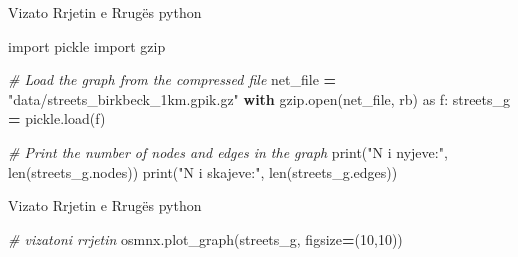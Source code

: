 \documentclass[
  ignorenonframetext,
]{beamer}
\newenvironment{Shaded}{\begin{snugshade}}{\end{snugshade}}
\newcommand{\BuiltInTok}[1]{#1}
\newcommand{\CommentTok}[1]{\textcolor[rgb]{0.56,0.35,0.01}{\textit{#1}}}
\newcommand{\ControlFlowTok}[1]{\textcolor[rgb]{0.13,0.29,0.53}{\textbf{#1}}}
\newcommand{\DecValTok}[1]{\textcolor[rgb]{0.00,0.00,0.81}{#1}}
\newcommand{\ImportTok}[1]{#1}
\newcommand{\NormalTok}[1]{#1}
\newcommand{\OperatorTok}[1]{\textcolor[rgb]{0.81,0.36,0.00}{\textbf{#1}}}
\newcommand{\StringTok}[1]{\textcolor[rgb]{0.31,0.60,0.02}{#1}}
\begin{document}
\begin{frame}[fragile]{Vizato Rrjetin e Rrugës}
\protect\hypertarget{vizato-rrjetin-e-rruguxebs-1}{}
python

\begin{Shaded}
\begin{Highlighting}[]
\ImportTok{import}\NormalTok{ pickle}
\ImportTok{import}\NormalTok{ gzip}

\CommentTok{\# Load the graph from the compressed file}
\NormalTok{net\_file }\OperatorTok{=} \StringTok{"data/streets\_birkbeck\_1km.gpik.gz"}
\ControlFlowTok{with}\NormalTok{ gzip.}\BuiltInTok{open}\NormalTok{(net\_file, }\StringTok{\textquotesingle{}rb\textquotesingle{}}\NormalTok{) }\ImportTok{as}\NormalTok{ f:}
\NormalTok{    streets\_g }\OperatorTok{=}\NormalTok{ pickle.load(f)}

\CommentTok{\# Print the number of nodes and edges in the graph}
\BuiltInTok{print}\NormalTok{(}\StringTok{"N i nyjeve:"}\NormalTok{, }\BuiltInTok{len}\NormalTok{(streets\_g.nodes))}
\BuiltInTok{print}\NormalTok{(}\StringTok{"N i skajeve:"}\NormalTok{, }\BuiltInTok{len}\NormalTok{(streets\_g.edges))}
\end{Highlighting}
\end{Shaded}
\end{frame}

\begin{frame}[fragile]{Vizato Rrjetin e Rrugës}
\protect\hypertarget{vizato-rrjetin-e-rruguxebs-2}{}
python

\begin{Shaded}
\begin{Highlighting}[]
\CommentTok{\# vizatoni rrjetin}
\NormalTok{osmnx.plot\_graph(streets\_g, figsize}\OperatorTok{=}\NormalTok{(}\DecValTok{10}\NormalTok{,}\DecValTok{10}\NormalTok{))}
\end{Highlighting}
\end{Shaded}
\end{frame}
\end{document}
